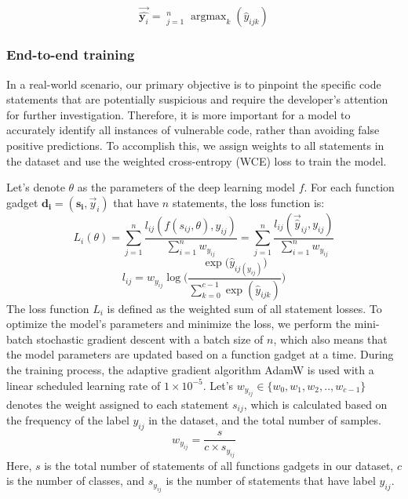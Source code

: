 \documentclass{ieeeaccess}
\DeclareMathOperator*{\argmax}{argmax}
\DeclareMathOperator*{\concat}{||}
\begin{document}
\begin{equation}\Vec{\hat{\mathbf{y}_{i}}} = \concat_{j=1}^{n}\argmax_k (\hat{y}_{ijk})\end{equation}


\subsubsection{End-to-end training} \label{sec:training}
In a real-world scenario, our primary objective is to pinpoint the specific code statements that are potentially suspicious and require the developer's attention for further investigation. Therefore, it is more important for a model to accurately identify all instances of vulnerable code, rather than  avoiding false positive predictions. To accomplish this, we assign weights to all statements in the dataset and use the weighted cross-entropy (WCE) loss to train the model.

Let's denote  $\theta$ as the parameters of  the deep learning model $f$. For each function gadget $\mathbf{d_i}= (\mathbf{s_i}, \Vec{y}_i)$ that have $n$ statements, the loss function is:  \begin{equation}
L_i(\theta) 
= \sum _{j=1}^{n}\frac{l_{ij}(f(s_{ij}, \theta),y_{ij})}{\sum _{i=1}^{n} w_{y_{ij}}}
= \sum _{j=1}^{n}\frac{l_{ij}(\Vec{\hat{y}}_{ij},y_{ij})}{\sum _{i=1}^{n} w_{y_{ij}}}
\end{equation}
\begin{equation}l_{ij} = w_{y_{ij}} \log \bigg ( \frac{{\exp(\hat{y}_{ij(y_{ij})}})}{\sum_{k=0}^{c-1} \exp(\hat{y}_{ijk} )}\bigg )\end{equation}
The loss function $L_i$ is defined as the weighted sum of all statement losses. To optimize the model's parameters and minimize the loss, we perform  the mini-batch stochastic gradient descent with a batch size of $n$, which also means that the model parameters are updated based on a function gadget at a time. During the training process, the adaptive gradient algorithm AdamW \cite{adamW} is used  with a linear scheduled learning rate of $1\times 10^{-5}$.
Let's $w_{y_{ij}} \in \{w_0, w_1, w_2,..,w_{c-1}\}$ denotes the weight assigned to each statement $s_{ij}$, which is calculated based on the frequency of the label $y_{ij}$ in the dataset, and the total number of samples.
\begin{equation}w_{y_{ij}}= \frac{s}{c \times s_{y_{ij}}}\end{equation}
Here, $s$ is the total number of statements of all functions gadgets in our dataset, $c$ is the number of classes, and $s_{y_{ij}}$ is the number of statements that have label $y_{ij}$.
\end{document}
